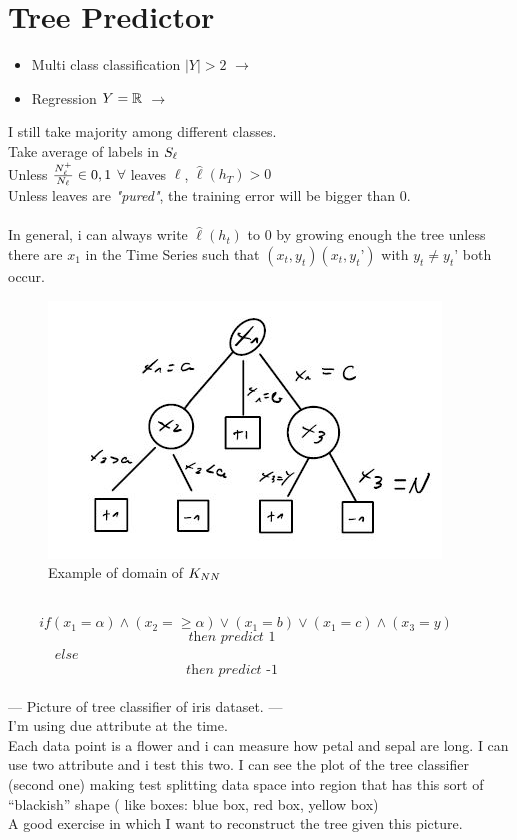 \documentclass[../main.tex]{subfiles}
\begin{document}
\section{Tree Predictor}
\begin{itemize}
\item Multi class classification $|Y| > 2$ $\longrightarrow$ 
\item Regression $Y = \mathbb{R} $ $\longrightarrow$ 
\end{itemize}
I still take majority among different classes.\\
Take average of labels in $S_{\ell}$
\\
Unless $\frac{N_{\ell}^+}{N_{\ell}} \in {0,1} $ \qquad $\forall$ leaves $\ell$, $\hat{\ell}(h_T) > 0$
\\
Unless leaves are \textit{"pured"}, the training error will be bigger than 0.
\\\\
In general, i can always write $\hat{\ell}(h_t)$ to 0 by growing enough the tree unless there are $x_1$ in the Time Series such that $(x_t, y_t)(x_t,y_t’)$ with $y_t \neq y_t’$ both occur.
\\
\begin{figure}[h]
    \centering
    \includegraphics[width=0.7\linewidth]{../img/lez5-img10.JPG}
    \caption{Example of domain of $K_{NN}$}
\end{figure}
\\
$$ if (x_1 = \alpha) \wedge (x_2 = \geq \alpha) \vee (x_1 = b) \vee (x_1 = c) \wedge (x_3= y) \qquad 
$$
$$
\textit{then predict 1} \qquad \qquad
$$
$
\qquad \quad \,\,else
$
$$
\textit{then predict -1} \qquad \qquad
$$
\\
--- Picture of tree classifier of iris dataset. ---\\
I’m using due attribute at the time.\\
Each data point is a flower and i can measure how petal and sepal are long.
I can use two attribute and i test this two. I can see the plot of the tree
classifier (second one) making test splitting data space into region that has
this sort of “blackish” shape ( like boxes: blue box, red box, yellow box)\\
A good exercise in which I want to reconstruct the tree given this picture.
\\\\
\end{document}
